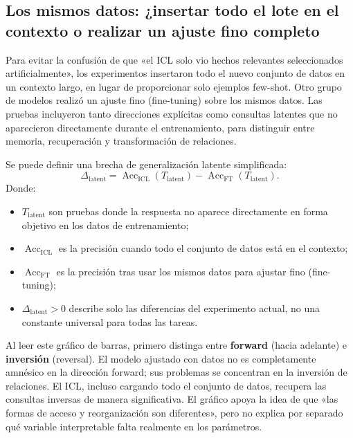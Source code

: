 \subsection{Los mismos datos: ¿insertar todo el lote en el contexto o realizar un ajuste fino completo}

Para evitar la confusión de que «el ICL solo vio hechos relevantes seleccionados artificialmente», los experimentos insertaron todo el nuevo conjunto de datos en un contexto largo, en lugar de proporcionar solo ejemplos few-shot. Otro grupo de modelos realizó un ajuste fino (fine-tuning) sobre los mismos datos. Las pruebas incluyeron tanto direcciones explícitas como consultas latentes que no aparecieron directamente durante el entrenamiento, para distinguir entre memoria, recuperación y transformación de relaciones.


Se puede definir una brecha de generalización latente simplificada:
$$
\Delta_{\text{latent}}=
\operatorname{Acc}_{\text{ICL}}(T_{\text{latent}})
-\operatorname{Acc}_{\text{FT}}(T_{\text{latent}}).
$$
Donde:
\begin{itemize}
  \item $T_{\text{latent}}$ son pruebas donde la respuesta no aparece directamente en forma objetivo en los datos de entrenamiento;
  \item $\operatorname{Acc}_{\text{ICL}}$ es la precisión cuando todo el conjunto de datos está en el contexto;
  \item $\operatorname{Acc}_{\text{FT}}$ es la precisión tras usar los mismos datos para ajustar fino (fine-tuning);
  \item $\Delta_{\text{latent}}>0$ describe solo las diferencias del experimento actual, no una constante universal para todas las tareas.
\end{itemize}


Al leer este gráfico de barras, primero distinga entre \textbf{forward} (hacia adelante) e \textbf{inversión} (reversal). El modelo ajustado con datos no es completamente amnésico en la dirección forward; sus problemas se concentran en la inversión de relaciones. El ICL, incluso cargando todo el conjunto de datos, recupera las consultas inversas de manera significativa. El gráfico apoya la idea de que «las formas de acceso y reorganización son diferentes», pero no explica por separado qué variable interpretable falta realmente en los parámetros.

